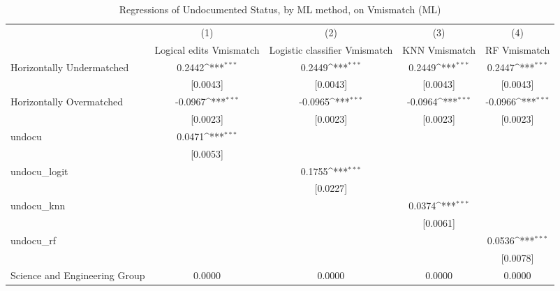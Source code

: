 \begin{table}[htbp]\centering
\def\sym#1{\ifmmode^{#1}\else\(^{#1}\)\fi}
\caption{Regressions of Undocumented Status, by ML method, on Vmismatch (ML)}
\begin{tabular}{l*{4}{c}}
\toprule
                    &\multicolumn{1}{c}{(1)}         &\multicolumn{1}{c}{(2)}         &\multicolumn{1}{c}{(3)}         &\multicolumn{1}{c}{(4)}         \\
                    &Logical edits Vmismatch         &Logistic classifier Vmismatch         &KNN Vmismatch         &RF Vmismatch         \\
\midrule
Horizontally Undermatched&      0.2442\sym{***}&      0.2449\sym{***}&      0.2449\sym{***}&      0.2447\sym{***}\\
                    &    [0.0043]         &    [0.0043]         &    [0.0043]         &    [0.0043]         \\
\addlinespace
Horizontally Overmatched&     -0.0967\sym{***}&     -0.0965\sym{***}&     -0.0964\sym{***}&     -0.0966\sym{***}\\
                    &    [0.0023]         &    [0.0023]         &    [0.0023]         &    [0.0023]         \\
\addlinespace
undocu              &      0.0471\sym{***}&                     &                     &                     \\
                    &    [0.0053]         &                     &                     &                     \\
\addlinespace
undocu\_logit        &                     &      0.1755\sym{***}&                     &                     \\
                    &                     &    [0.0227]         &                     &                     \\
\addlinespace
undocu\_knn          &                     &                     &      0.0374\sym{***}&                     \\
                    &                     &                     &    [0.0061]         &                     \\
\addlinespace
undocu\_rf           &                     &                     &                     &      0.0536\sym{***}\\
                    &                     &                     &                     &    [0.0078]         \\
\addlinespace
Science and Engineering Group&      0.0000         &      0.0000         &      0.0000         &      0.0000         \\

\end{tabular}
\end{table}

